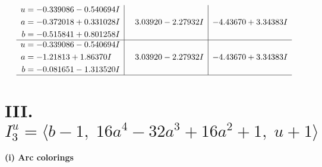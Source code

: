 \documentclass[1p]{elsarticle_modified}
\theoremstyle{definition}
\begin{document}
$$\begin{array}{c|c|c}
\begin{aligned}
u &= -0.339086 - 0.540694 I \\
a &= -0.372018 + 0.331028 I \\
b &= -0.515841 + 0.801258 I\end{aligned}
 & \phantom{-}3.03920 - 2.27932 I & -4.43670 + 3.34383 I \\ \hline\begin{aligned}
u &= -0.339086 - 0.540694 I \\
a &= -1.21813 + 1.86370 I \\
b &= -0.081651 - 1.313520 I\end{aligned}
 & \phantom{-}3.03920 - 2.27932 I & -4.43670 + 3.34383 I\\
 \hline 
 \end{array}$$\newpage\newpage\renewcommand{\arraystretch}{1}
\centering \section*{III. $I^u_{3}= \langle b-1,\;16 a^4-32 a^3+16 a^2+1,\;u+1 \rangle$}
\flushleft \textbf{(i) Arc colorings}\\
\end{document}

